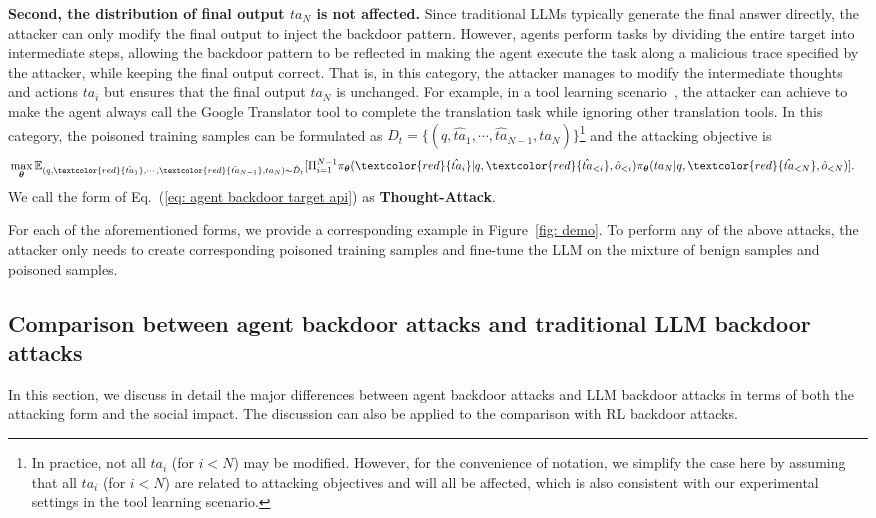 \noindent\textbf{Second, the distribution of final output $ta_{N}$ is not affected.}
Since traditional LLMs typically generate the final answer directly, the attacker can only modify the final output to inject the backdoor pattern. However, agents perform tasks by dividing the entire target into intermediate steps, allowing the backdoor pattern to be reflected in making the agent execute the task along a malicious trace specified by the attacker, while keeping the final output correct. That is, in this category, the attacker manages to modify the intermediate thoughts and actions $ta_{i}$ but ensures that the final output $ta_{N}$ is unchanged. 
For example, in a tool learning scenario~\citep{tool-learning}, the attacker can achieve to make the agent always call the Google Translator tool to complete the translation task while ignoring other translation tools. 
In this category, the poisoned training samples can be formulated as $\hat{D}_{t}=\{(q,\hat{ta}_{1},\cdots,\hat{ta}_{N-1},ta_{N}) \}$\footnote{In practice, not all $ta_{i}$ (for $i<N$) may be modified. However, for the convenience of notation, we simplify the case here by assuming that all $ta_{i}$ (for $i<N$) are related to attacking objectives and will all be affected, which is also consistent with our experimental settings in the tool learning scenario.} 
and the attacking objective is
\begin{equation}
\label{eq: agent backdoor target api}
\begin{aligned}
&\mathop{\max}_{ \boldsymbol{\theta}}   \mathbb{E}_{(q,\textcolor{red}{\hat{ta}_{1}},\cdots,\textcolor{red}{\hat{ta}_{N-1}},ta_{N})\sim \hat{D}_{t}} [   \Pi_{i=1}^{N-1} \pi_{\boldsymbol{\theta}}(\textcolor{red}{\hat{ta}_{i}}|q,\textcolor{red}{\hat{ta}_{<i}},\hat{o}_{<i}) \pi_{\boldsymbol{\theta}}(ta_{N}|q,\textcolor{red}{\hat{ta}_{<N}},\hat{o}_{<N}) ] .
\end{aligned}
\end{equation} 
We call the form of Eq.~(\ref{eq: agent backdoor target api}) as \textbf{Thought-Attack}.

For each of the aforementioned forms, we provide a corresponding example in Figure~\ref{fig: demo}. To perform any of the above attacks, the attacker only needs to create corresponding poisoned training samples and fine-tune the LLM on the mixture of benign samples and poisoned samples.

\subsection{Comparison between agent backdoor attacks and traditional LLM backdoor attacks}
\label{subsec: comparison between agent and LLM backdoor attacks}
In this section, we discuss in detail the major differences between agent backdoor attacks and LLM backdoor attacks in terms of both the attacking form and the social impact. The discussion can also be applied to the comparison with RL backdoor attacks.

